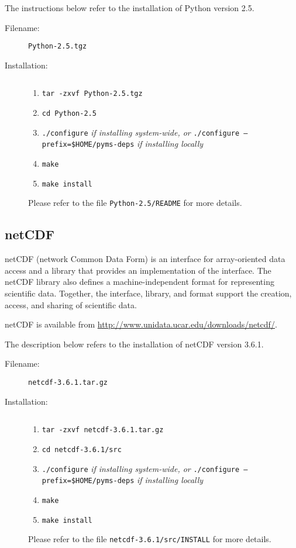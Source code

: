 The instructions below refer to the installation of Python version
2.5.

\begin{description}
\item [Filename:] {\tt Python-2.5.tgz}
\item [Installation:] $ $
  \begin{enumerate}
  \item {\tt tar -zxvf Python-2.5.tgz}
  \item {\tt cd Python-2.5}
  \item {\tt ./configure} {\it if installing system-wide, or}\newline
        {\tt ./configure --prefix=\$HOME/pyms-deps} {\it if installing locally}
  \item {\tt make}
  \item {\tt make install}
  \end{enumerate}
Please refer to the file {\tt Python-2.5/README} for more details.
\end{description}

\subsection{netCDF}

netCDF (network Common Data Form) is an interface for array-oriented
data access and a library that provides an implementation of the
interface. The netCDF library also defines a machine-independent
format for representing scientific data. Together, the interface,
library, and format support the creation, access, and sharing of
scientific data.

netCDF is available from \url{http://www.unidata.ucar.edu/downloads/netcdf/}.

The description below refers to the installation of netCDF version
3.6.1.

\begin{description}
\item [Filename:] {\tt netcdf-3.6.1.tar.gz}
\item [Installation:] $ $
  \begin{enumerate}
  \item {\tt tar -zxvf netcdf-3.6.1.tar.gz}
  \item {\tt cd netcdf-3.6.1/src}
  \item {\tt ./configure} {\it if installing system-wide, or}\newline
        {\tt ./configure --prefix=\$HOME/pyms-deps} {\it if installing locally}
  \item {\tt make}
  \item {\tt make install}
  \end{enumerate}
Please refer to the file {\tt netcdf-3.6.1/src/INSTALL} for more details.
\end{description}

